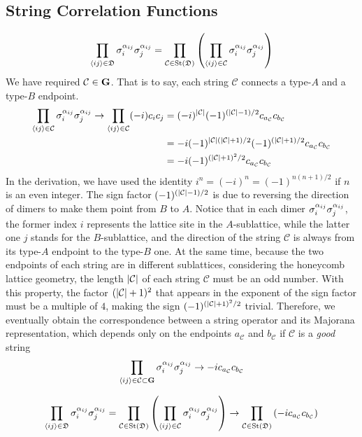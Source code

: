 \subsection{String Correlation Functions}
\[
\prod_{\langle ij \rangle\in\mathfrak{D}}
    \sigma_{i}^{\alpha_{ij}}\sigma_{j}^{\alpha_{ij}}
=
\prod_{\mathcal{C} \in \mathrm{St}(\mathfrak{D})}
\left( 
    \prod_{\langle ij \rangle\in\mathcal{C}}
    \sigma_{i}^{\alpha_{ij}}\sigma_{j}^{\alpha_{ij}}
 \right)
\]
We have required $\mathcal{C} \in \mathbf{G}$. That is to say, each string $\mathcal{C}$ connects a type-$A$ and a type-$B$ endpoint.
\begin{align*}
    \prod_{\langle ij \rangle\in\mathcal{C}}
    \sigma_{i}^{\alpha_{ij}}\sigma_{j}^{\alpha_{ij}}
    \to
    \prod_{\langle ij \rangle\in\mathcal{C}}
        (-i) c_ic_j 
    &=
    (-i)^{\left| \mathcal{C} \right|} (-1)^{(\left| \mathcal{C} \right| - 1)/2}c_{a_{\mathcal{C}}}c_{b_{\mathcal{C}}} \\
    &=
    -i
    (-1)^{\left| \mathcal{C} \right|(\left| \mathcal{C} \right|+1)/2} (-1)^{(\left| \mathcal{C} \right| + 1)/2}c_{a_{\mathcal{C}}}c_{b_{\mathcal{C}}} \\
    &= -i (-1)^{(\left| \mathcal{C} \right| + 1)^2/2} c_{a_{\mathcal{C}}}c_{b_{\mathcal{C}}}
\end{align*}
In the derivation, we have used the identity $i^{n} = (-i)^n = (-1)^{n(n+1)/2}$ if $n$ is an even integer. The sign factor $(-1)^{(\left| \mathcal{C} \right|-1)/2}$ is due to reversing the direction of dimers to make them point from $B$ to $A$. Notice that in each dimer $\sigma_{i}^{\alpha_{ij}}\sigma_{j}^{\alpha_{ij}}$, the former index $i$ represents the lattice site in the $A$-sublattice, while the latter one $j$ stands for the $B$-sublattice, and the direction of the string $\mathcal{C}$ is always from its type-$A$ endpoint to the type-$B$ one. At the same time, because the two endpoints of each string are in different sublattices, considering the honeycomb lattice geometry, the length $\left| \mathcal{C} \right|$ of each string $\mathcal{C}$ must be an odd number. With this property, the factor $(\left| \mathcal{C} \right| + 1)^2$ that appears in the exponent of the sign factor must be a multiple of $4$, making the sign $(-1)^{(\left| \mathcal{C} \right| + 1)^2/2}$ trivial. Therefore, we eventually obtain the correspondence between a string operator and its Majorana representation, which depends only on the endpoints $a_\mathcal{C}$ and $b_\mathcal{C}$ if $\mathcal{C}$ is a \textit{good} string
\begin{equation}
    \prod_{\langle ij \rangle\in\mathcal{C} \subset \mathbf{G}}
    \sigma_{i}^{\alpha_{ij}}\sigma_{j}^{\alpha_{ij}} 
    \to 
    -i c_{a_{\mathcal{C}}}c_{b_{\mathcal{C}}}
\end{equation}

\begin{equation}
    \prod_{\langle ij \rangle\in\mathfrak{D}}
    \sigma_{i}^{\alpha_{ij}}\sigma_{j}^{\alpha_{ij}}
    =
    \prod_{\mathcal{C} \in \mathrm{St}(\mathfrak{D})}
    \left( 
        \prod_{\langle ij \rangle\in\mathcal{C}}
        \sigma_{i}^{\alpha_{ij}}\sigma_{j}^{\alpha_{ij}}
     \right)
    \to 
    \prod_{\mathcal{C} \in \mathrm{St}(\mathfrak{D})} 
    \left( -i c_{a_{\mathcal{C}}}c_{b_{\mathcal{C}}}  \right)
\end{equation}

